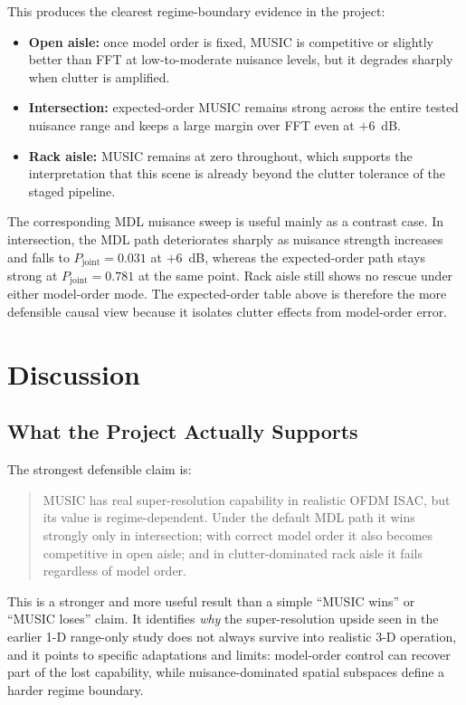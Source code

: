 \documentclass[11pt]{article}
\newcommand{\pjoint}{P_{\mathrm{joint}}}
\begin{document}
This produces the clearest regime-boundary evidence in the project:
\begin{itemize}
  \item \textbf{Open aisle:} once model order is fixed, MUSIC is competitive or slightly better than FFT at low-to-moderate nuisance levels, but it degrades sharply when clutter is amplified.
  \item \textbf{Intersection:} expected-order MUSIC remains strong across the entire tested nuisance range and keeps a large margin over FFT even at $+6$~dB.
  \item \textbf{Rack aisle:} MUSIC remains at zero throughout, which supports the interpretation that this scene is already beyond the clutter tolerance of the staged pipeline.
\end{itemize}

The corresponding MDL nuisance sweep is useful mainly as a contrast case. In intersection, the MDL path deteriorates sharply as nuisance strength increases and falls to $\pjoint = 0.031$ at $+6$~dB, whereas the expected-order path stays strong at $\pjoint = 0.781$ at the same point. Rack aisle still shows no rescue under either model-order mode. The expected-order table above is therefore the more defensible causal view because it isolates clutter effects from model-order error.

\section{Discussion}

\subsection{What the Project Actually Supports}

The strongest defensible claim is:
\begin{quote}
MUSIC has real super-resolution capability in realistic OFDM ISAC, but its value is regime-dependent. Under the default MDL path it wins strongly only in intersection; with correct model order it also becomes competitive in open aisle; and in clutter-dominated rack aisle it fails regardless of model order.
\end{quote}

This is a stronger and more useful result than a simple ``MUSIC wins'' or ``MUSIC loses'' claim. It identifies \emph{why} the super-resolution upside seen in the earlier 1-D range-only study does not always survive into realistic 3-D operation, and it points to specific adaptations and limits: model-order control can recover part of the lost capability, while nuisance-dominated spatial subspaces define a harder regime boundary.
\end{document}
